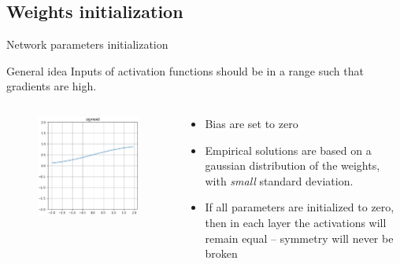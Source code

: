 \documentclass[xcolor=pdftex,dvipsnames,table,mathserif]{beamer}
\begin{document}
\subsection{Weights initialization}


\begin{frame}{Network parameters initialization}

\begin{block}{General idea}
          Inputs of activation functions should be in a range such that gradients are high.
\end{block}

  \begin{columns}
    \begin{column}{.3\textwidth}
      \begin{figure}[ht]
        \centering
        \includegraphics[width=\textwidth]{act_sigm.png}
      \end{figure}

    \end{column}

    \begin{column}{.7\textwidth}
      \begin{itemize}
      \item Bias are set to zero
      \item Empirical solutions are based on a gaussian distribution of the weights, with \textit{small} standard deviation.
      \item If all parameters are initialized to zero, then in each layer the activations will remain equal -- symmetry will never be broken
      \end{itemize}
    \end{column}
  \end{columns}
\end{frame}
\end{document}
